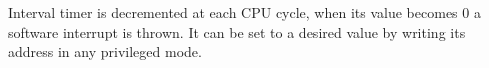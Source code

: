 \label{sec:man:device}

\label{sec:man:intervalTimer}

Interval timer is decremented at each CPU cycle, when its value becomes 0 a software interrupt is thrown. It can be set to a desired value by writing its address in any privileged mode.


